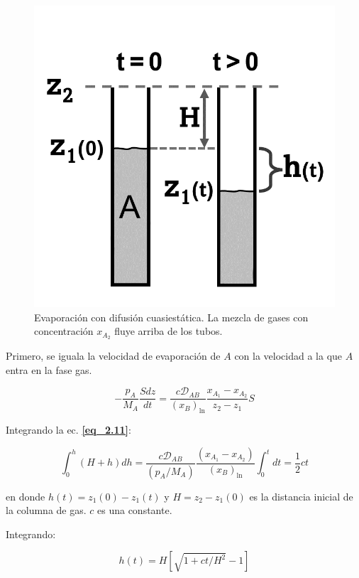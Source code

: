 \begin{figure}[H]
	\centering
	\includegraphics[scale=0.2]{./Capitulo2/Imagenes/fig-2-3.PNG}
	\caption{Evaporación con difusión cuasiestática. La mezcla de gases con concentración $x_{A_2}$ fluye arriba de los tubos.}
	\end{figure}
	
Primero, se iguala la velocidad de evaporación de $A$ con la velocidad a la que $A$ entra en la fase gas.

\begin{equation}
-\frac{p_A}{M_A} \frac{Sdz}{dt} = \frac{c \mathscr{D}_{AB}}{(x_B)_{\ln}} \frac{x_{A_1}-x_{A_2}}{z_2 - z_1} S
\label{eq_2.11}
\end{equation}

Integrando la ec. \textbf{\eqref{eq_2.11}}: 

\begin{equation}
	\int_0^h (H+h)dh = \frac{c \mathscr{D}_{AB}}{(p_A/M_A)} \frac{(x_{A_1}-x_{A_2})}{(x_B)_{\ln}} \int_0^t dt = \frac{1}{2}c t
\end{equation}

en donde $h(t) = z_1(0) - z_1(t)$ y $H = z_2 - z_1(0)$ es la distancia inicial de la columna de gas. $c$ es una constante.

Integrando: 

\begin{equation}
	h(t) = H \left[ \sqrt{1+ct/H^2}-1 \right]
\end{equation}

